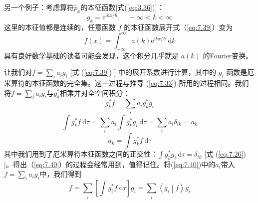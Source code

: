     另一个例子：考虑算符$\hat{p}_x$的本征函数[式(\ref{eq:3.36})]：
    \begin{equation*}
        g_k = \mathrm{e}^{\mathrm{i}kx/\hbar}, \quad -\infty < k < \infty
    \end{equation*}
    这里的本征值都是连续的，任意函数 $f$ 的本征函数展开式（\ref{eq:7.39}）变为
    \begin{equation*}
        f\left(x\right) = \int_{-\infty}^{\infty} a\left(k\right) \mathrm{e}^{\mathrm{i}kx/\hbar} \:\mathrm{d}k
    \end{equation*}
    具有良好数学基础的读者可能会发现，这个积分几乎就是 $a\left(k\right)$ 的Fourier变换。

    让我们对$f=\sum_{i}a_ig_i$ [式 (\ref{eq:7.39}) ] 中的展开系数进行计算，其中的 $g_i$ 函数是厄米算符的本征函数的完全集。这一过程与推导 (\ref{eq:7.33}) 所用的过程相同。我们将$f = \sum_{i}a_ig_i$与$g_k^{\ast}$相乘并对全空间积分：
    \begin{equation*}
        g_k^{\ast} f = \sum_{i} a_i g_k^{\ast} g_i
    \end{equation*}
    \begin{equation*}
        \int g_k^{\ast} f \:\mathrm{d}\tau = \sum_{i} a_i \int g_k^{\ast} g_i \:\mathrm{d}\tau = \sum_{i} a_i \delta_{ik} = a_k
    \end{equation*}
    \begin{equation}
        a_k = \int g_k^{\ast} f \:\mathrm{d}\tau
        \label{eq:7.40}
    \end{equation}
    其中我们用到了厄米算符本征函数之间的正交性：$\int g_k^{\ast} g_i \:\mathrm{d}\tau = \delta_{ik}$ [式 (\ref{eq:7.26}) ]。得出（\ref{eq:7.40}）的过程会经常用到，值得记住。将(\ref{eq:7.40})中的$a_i$带入$f = \sum_{i}a_ig_i$中，我们得到
    \begin{equation}
        f = \sum_{i}\left[\int g_i^{\ast}f \:\mathrm{d}\tau\right]g_i = \sum_{i}\left\langle g_i \middle| f \right\rangle g_i
        \label{eq:7.41}
    \end{equation}

